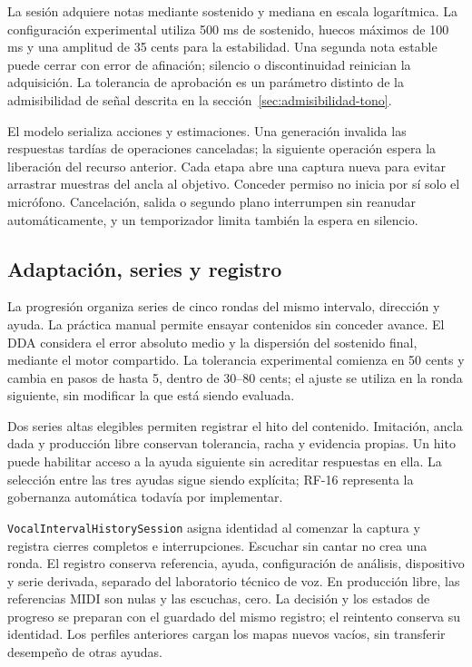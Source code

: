 La sesión adquiere notas mediante sostenido y mediana en escala logarítmica.
La configuración experimental utiliza 500 ms de sostenido, huecos máximos de
100 ms y una amplitud de 35 cents para la estabilidad. Una segunda nota estable
puede cerrar con error de afinación; silencio o discontinuidad reinician la
adquisición. La tolerancia de aprobación es un parámetro distinto de la
admisibilidad de señal descrita en la sección~\ref{sec:admisibilidad-tono}.

El modelo serializa acciones y estimaciones. Una generación invalida las
respuestas tardías de operaciones canceladas; la siguiente operación espera
la liberación del recurso anterior. Cada etapa abre una captura nueva para
evitar arrastrar muestras del ancla al objetivo. Conceder permiso no inicia
por sí solo el micrófono. Cancelación, salida o segundo plano interrumpen sin
reanudar automáticamente, y un temporizador limita también la espera en silencio.

\subsection{Adaptación, series y registro}
La progresión organiza series de cinco rondas del mismo intervalo, dirección
y ayuda. La práctica manual permite ensayar contenidos sin conceder avance.
El DDA considera el error absoluto medio y la dispersión del sostenido final,
mediante el motor compartido. La tolerancia experimental comienza en 50 cents
y cambia en pasos de hasta 5, dentro de 30--80 cents; el ajuste se utiliza
en la ronda siguiente, sin modificar la que está siendo evaluada.

Dos series altas elegibles permiten registrar el hito del contenido. Imitación,
ancla dada y producción libre conservan tolerancia, racha y evidencia propias.
Un hito puede habilitar acceso a la ayuda siguiente sin acreditar respuestas
en ella. La selección entre las tres ayudas sigue siendo explícita; RF-16
representa la gobernanza automática todavía por implementar.

\texttt{VocalIntervalHistorySession} asigna identidad al comenzar la captura y
registra cierres completos e interrupciones. Escuchar sin cantar no crea una
ronda. El registro conserva referencia, ayuda, configuración de análisis,
dispositivo y serie derivada, separado del laboratorio técnico de voz.
En producción libre, las referencias MIDI son nulas y las escuchas, cero.
La decisión y los estados de progreso se preparan con el guardado del mismo
registro; el reintento conserva su identidad. Los perfiles anteriores cargan
los mapas nuevos vacíos, sin transferir desempeño de otras ayudas.

